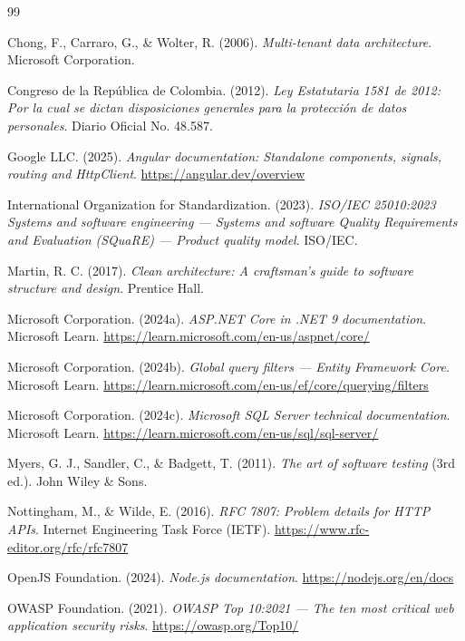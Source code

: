 \documentclass[12pt,a4paper]{article}
\begin{document}
\newpage
\nocite{*}
\begin{thebibliography}{99}

Chong, F., Carraro, G., \& Wolter, R. (2006). \textit{Multi-tenant data architecture}. Microsoft Corporation.

Congreso de la Rep\'ublica de Colombia. (2012). \textit{Ley Estatutaria 1581 de 2012: Por la cual se dictan disposiciones generales para la protecci\'on de datos personales}. Diario Oficial No. 48.587.

Google LLC. (2025). \textit{Angular documentation: Standalone components, signals, routing and HttpClient}. \url{https://angular.dev/overview}

International Organization for Standardization. (2023). \textit{ISO/IEC 25010:2023 Systems and software engineering --- Systems and software Quality Requirements and Evaluation (SQuaRE) --- Product quality model}. ISO/IEC.

Martin, R. C. (2017). \textit{Clean architecture: A craftsman's guide to software structure and design}. Prentice Hall.

Microsoft Corporation. (2024a). \textit{ASP.NET Core in .NET 9 documentation}. Microsoft Learn. \url{https://learn.microsoft.com/en-us/aspnet/core/}

Microsoft Corporation. (2024b). \textit{Global query filters --- Entity Framework Core}. Microsoft Learn. \url{https://learn.microsoft.com/en-us/ef/core/querying/filters}

Microsoft Corporation. (2024c). \textit{Microsoft SQL Server technical documentation}. Microsoft Learn. \url{https://learn.microsoft.com/en-us/sql/sql-server/}

Myers, G. J., Sandler, C., \& Badgett, T. (2011). \textit{The art of software testing} (3rd ed.). John Wiley \& Sons.

Nottingham, M., \& Wilde, E. (2016). \textit{RFC 7807: Problem details for HTTP APIs}. Internet Engineering Task Force (IETF). \url{https://www.rfc-editor.org/rfc/rfc7807}

OpenJS Foundation. (2024). \textit{Node.js documentation}. \url{https://nodejs.org/en/docs}

OWASP Foundation. (2021). \textit{OWASP Top 10:2021 --- The ten most critical web application security risks}. \url{https://owasp.org/Top10/}

\end{thebibliography}
\end{document}
